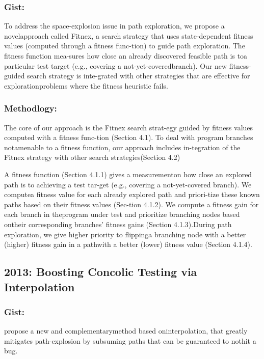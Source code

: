 \documentclass[	runningheads,
				a4paper]{llncs}
\begin{document}
\subsubsection{Gist:}
To address the space-explosion  issue  in  path  exploration,  we  propose  a  novelapproach called Fitnex, a search strategy that uses state-dependent fitness values (computed through a fitness func-tion) to guide path exploration.  The fitness function mea-sures how close an already discovered feasible path is toa  particular  test  target  (e.g.,  covering  a  not-yet-coveredbranch).   Our new fitness-guided search strategy is  inte-grated with other strategies that are effective for explorationproblems where the fitness heuristic fails.

\subsubsection{Methodlogy:}
The core of our approach is the Fitnex search strat-egy guided by fitness values computed with a fitness func-tion (Section 4.1).  To deal with program branches notamenable to a fitness function, our approach includes in-tegration of the Fitnex strategy with other search strategies(Section 4.2)

A fitness function (Section 4.1.1) gives a measurementon how close an explored path is to achieving a test tar-get (e.g., covering a not-yet-covered branch). We computea fitness value for each already explored path and priori-tize these known paths based on their fitness values (Sec-tion 4.1.2). We compute a fitness gain for each branch in theprogram under test and prioritize branching nodes based ontheir corresponding branches’ fitness gains (Section 4.1.3).During path exploration, we give higher priority to flippinga branching node with a better (higher) fitness gain in a pathwith a better (lower) fitness value (Section 4.1.4).

\subsection{2013: Boosting Concolic Testing via Interpolation}
\subsubsection{Gist:}
propose  a  new  and  complementarymethod based oninterpolation, that greatly mitigates path-explosion by subsuming paths that can be guaranteed to nothit a bug.
\end{document}
